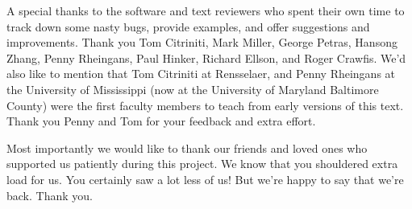 A special thanks to the software and text reviewers who spent their own time to track down some nasty bugs, provide examples, and offer suggestions and improvements. Thank you Tom Citriniti, Mark Miller, George Petras, Hansong Zhang, Penny Rheingans, Paul Hinker, Richard Ellson, and Roger Crawfis. We'd also like to mention that Tom Citriniti at Rensselaer, and Penny Rheingans at the University of Mississippi (now at the University of Maryland Baltimore County) were the first faculty members to teach from early versions of this text. Thank you Penny and Tom for your feedback and extra effort.

Most importantly we would like to thank our friends and loved ones who supported us patiently during this project. We know that you shouldered extra load for us. You certainly saw a lot less of us! But we're happy to say that we're back. Thank you.

